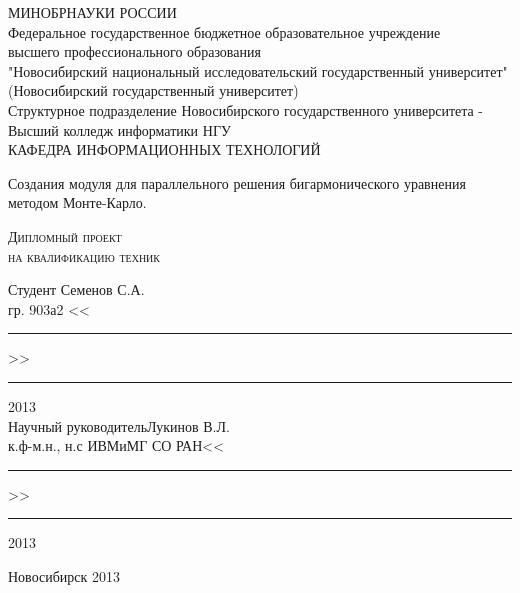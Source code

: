 \begin{titlepage}
\begin{center}
МИНОБРНАУКИ РОССИИ\\
Федеральное государственное бюджетное образовательное учреждение\\
высшего профессионального образования \\
"Новосибирский национальный исследовательский государственный университет"\\
(Новосибирский государственный университет)\\
Структурное подразделение Новосибирского государственного университета - \\
Высший колледж информатики НГУ\\
КАФЕДРА ИНФОРМАЦИОННЫХ ТЕХНОЛОГИЙ
\end{center}

\vspace{8em}

\begin{center}
\Large Создания модуля для параллельного решения бигармонического уравнения методом Монте-Карло. 
\end{center}

\vspace{2.5em}

\begin{center}
\textsc{Дипломный проект\\ на квалификацию техник }
\end{center}

\vspace{6em}

\begin{flushleft}
 Студент \hfill Семенов С.А. \\
гр. 903а2 \hfill <<\rule{3ex}{0,1mm}>>\rule{10ex}{0,1mm}2013 \\
\vspace{1.5em}
Научный руководитель\hfill Лукинов В.Л.\\
к.ф-м.н., н.с ИВМиМГ СО РАН\hfill <<\rule{3ex}{0,1mm}>>\rule{10ex}{0,1mm}2013 \\
\end{flushleft}

\vspace{\fill}
\begin{center}
Новосибирск 2013
\end{center}
\end{titlepage}
